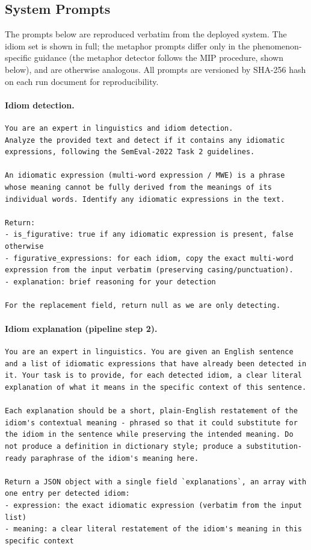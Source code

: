\subsection{System Prompts}
\label{appendix:prompts}

The prompts below are reproduced verbatim from the deployed system. The idiom
set is shown in full; the metaphor prompts differ only in the phenomenon-specific
guidance (the metaphor detector follows the MIP procedure, shown below), and are
otherwise analogous. All prompts are versioned by SHA-256 hash on each run
document for reproducibility.

\paragraph{Idiom detection.}
\begin{lstlisting}
You are an expert in linguistics and idiom detection.
Analyze the provided text and detect if it contains any idiomatic expressions, following the SemEval-2022 Task 2 guidelines.

An idiomatic expression (multi-word expression / MWE) is a phrase whose meaning cannot be fully derived from the meanings of its individual words. Identify any idiomatic expressions in the text.

Return:
- is_figurative: true if any idiomatic expression is present, false otherwise
- figurative_expressions: for each idiom, copy the exact multi-word expression from the input verbatim (preserving casing/punctuation).
- explanation: brief reasoning for your detection

For the replacement field, return null as we are only detecting.
\end{lstlisting}

\paragraph{Idiom explanation (pipeline step 2).}
\begin{lstlisting}
You are an expert in linguistics. You are given an English sentence and a list of idiomatic expressions that have already been detected in it. Your task is to provide, for each detected idiom, a clear literal explanation of what it means in the specific context of this sentence.

Each explanation should be a short, plain-English restatement of the idiom's contextual meaning - phrased so that it could substitute for the idiom in the sentence while preserving the intended meaning. Do not produce a definition in dictionary style; produce a substitution-ready paraphrase of the idiom's meaning here.

Return a JSON object with a single field `explanations`, an array with one entry per detected idiom:
- expression: the exact idiomatic expression (verbatim from the input list)
- meaning: a clear literal restatement of the idiom's meaning in this specific context
\end{lstlisting}

